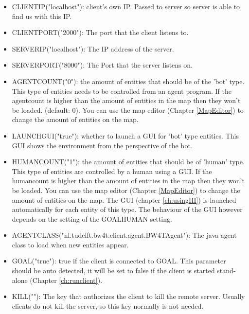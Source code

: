 \documentclass[11pt,a4paper]{article}
\begin{document}
\begin{itemize}
\item

    CLIENTIP("localhost"):    client's own IP. Passed to server so server is able to find us with this IP. 

\item
    CLIENTPORT("2000"):   The port that the client listens to. 

\item
    SERVERIP("localhost"):
 The IP address of the server. 
  
\item
    SERVERPORT("8000"):
   The Port that the server listens on. 

\item
    AGENTCOUNT("0"):
 the amount of entities that should be of the 'bot' type. This type of entities needs to be controlled from an agent program. If the agentcount is higher than the amount of entities in the map then they won't be loaded. (default: 0). You can use the map editor (Chapter \ref{MapEditor}) to change the amount of entities on the map. 
    
\item
    LAUNCHGUI("true"):
    whether to launch a GUI for 'bot' type entities. This GUI shows the environment from the perspective of the bot. 
        
\item
    HUMANCOUNT("1"):
    the amount of entities that should be of 'human' type. This type of entities are controlled by a human using a GUI. If the humancount is higher than the amount of entities in the map then they won't be loaded. You can use the map editor (Chapter \ref{MapEditor}) to change the amount of entities on the map. The GUI (chapter \ref{ch:usingHI}) is launched automatically for each entity of this type. The behaviour of the GUI however depends on the setting of the GOALHUMAN setting.


\item
    AGENTCLASS("nl.tudelft.bw4t.client.agent.BW4TAgent"):
    The java agent class to load when new entities appear.
   

\item
    GOAL("true"):
    true if the client is connected to GOAL. This parameter should be auto detected, it will be set to false if the client is started stand-alone (Chapter \ref{ch:runclient}).

\item
    KILL(""):
  The key that authorizes the client to kill the remote server. Usually clients do not kill the server, so this key normally is not needed.
 

\end{itemize}
\end{document}
